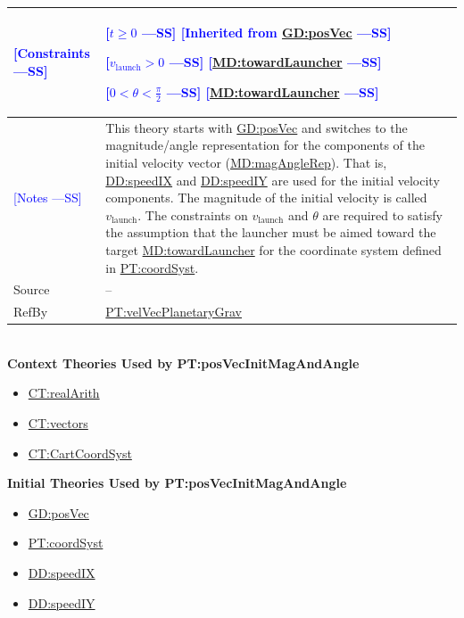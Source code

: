\documentclass[12pt]{article}
\newcommand{\authornote}[3]{\textcolor{#1}{[#3 ---#2]}}
\newcommand{\authornote}[3]{}
\newcommand{\wss}[1]{\authornote{blue}{SS}{#1}}
\begin{document}
\begin{minipage}{\textwidth}
\begin{tabular}{>{\raggedright}p{}>{\raggedright\arraybackslash}p{}}
\\ \midrule
\wss{Constraints} & 
\begin{symbDescription}
\item \wss{$t \geq 0$} \wss{Inherited from \hyperref[GD:posVec]{GD:posVec}}
\item \wss{$v_\text{launch} > 0$} \wss{\hyperref[MD:towardLauncher]{MD:towardLauncher}}
\item \wss{$
0 < \theta < \frac{\pi}{2}$} \wss{\hyperref[MD:towardLauncher]{MD:towardLauncher}}
\end{symbDescription}

\\ \midrule \wss{Notes} & This theory starts with
\hyperref[GD:posVec]{GD:posVec} and switches to the magnitude/angle
representation for the components of the initial velocity vector
(\hyperref[MD:magAngleRep]{MD:magAngleRep}).  That is,
\hyperref[DD:speedIX]{DD:speedIX} and \hyperref[DD:speedIY]{DD:speedIY} are used
for the initial velocity components. The magnitude of the initial velocity is
called $v_\text{launch}$.  The constraints on $v_\text{launch}$ and $\theta$ are
required to satisfy the assumption that the launcher must be aimed toward the
target \hyperref[MD:towardLauncher]{MD:towardLauncher} for the coordinate system
defined in \hyperref[PT:coordSyst]{PT:coordSyst}.

\\ \midrule
Source & --
         
\\ \midrule
RefBy & \hyperref[PT:velVecPlanetaryGrav]{PT:velVecPlanetaryGrav}

\\ \bottomrule
\end{tabular}
\end{minipage}
~\\

\noindent \textbf{Context Theories Used by PT:posVecInitMagAndAngle}

\begin{itemize}
\item \hyperref[CT:realArith]{CT:realArith}
\item \hyperref[CT:vectors]{CT:vectors}
\item \hyperref[CT:CartCoordSyst]{CT:CartCoordSyst}
\end{itemize}

\noindent \textbf{Initial Theories Used by PT:posVecInitMagAndAngle}

\begin{itemize}
\item \hyperref[GD:posVec]{GD:posVec}
\item \hyperref[PT:coordSyst]{PT:coordSyst}
\item \hyperref[DD:speedIX]{DD:speedIX}
\item \hyperref[DD:speedIY]{DD:speedIY}
\end{itemize}
\end{document}
